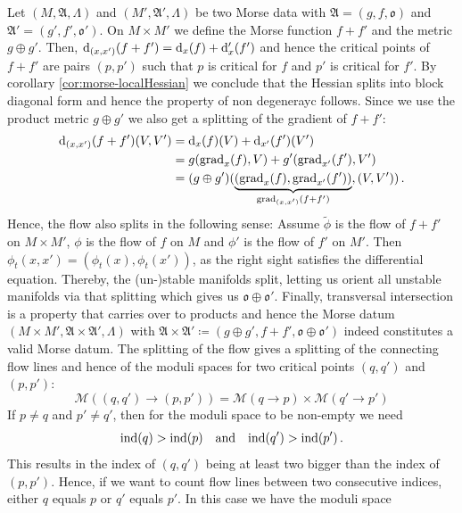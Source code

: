 \begin{definition}\label{def: Definition produce Morse datum}
	Let $(M,\mathfrak{A},\Lambda)$ and $(M',\mathfrak{A}',\Lambda)$ be two Morse data with $\mathfrak{A}=(g,f,\mathfrak{o})$ and $ \mathfrak{A}'=(g',f',\mathfrak{o}')$. On $M\times M'$ we define the Morse function $f+f'$ and the metric $g\oplus g'$. Then, $\mathop{}\!\mathrm{d}_{(x,x')}(f+f')=\mathop{}\!\mathrm{d}_x(f)+\mathop{}\!\mathrm{d}_x'(f')$ and hence the critical points of $f+f'$ are pairs $(p,p')$ such that $p$ is critical for $f$ and $p'$ is critical for $f'$. By corollary \ref{cor:morse-localHessian} we conclude that the Hessian splits into block diagonal form and hence the property of non degenerayc follows. Since we use the product metric $g\oplus g'$ we also get a splitting of the gradient of $f+f'$: 
	\begin{align*}
		\mathop{}\!\mathrm{d}_{(x,x')}(f+f')(V,V')
		&=\mathop{}\!\mathrm{d}_x(f)(V)+\mathop{}\!\mathrm{d}_{x'}(f')(V')\\
		&=g(\mathrm{grad}_x(f),V)+g'(\mathrm{grad}_{x'}(f'),V')\\
		&=(g\oplus g')(\underbrace{(\mathrm{grad}_x(f),\mathrm{grad}_{x'}(f'))}_{\mathrm{grad}_{(x,x')}(f+f')},(V,V'))\,.
	\end{align*} Hence, the flow also splits in the following sense: Assume $\tilde{\phi}$ is the flow of $f+f'$ on $M\times M'$, $\phi$ is the flow of $f$ on $M$ and $\phi'$ is the flow of $f'$ on $M'$. Then $\phi_t(x,x')=(\phi_t(x),\phi_t(x'))$, as the right sight satisfies the differential equation. Thereby, the (un-)stable manifolds split, letting us orient all unstable manifolds via that splitting which gives us $\mathfrak{o}\oplus \mathfrak{o}'$. Finally, transversal intersection is a property that carries over to products and hence the Morse datum $(M\times M',\mathfrak{A}\times \mathfrak{A}',\Lambda)$ with $\mathfrak{A}\times \mathfrak{A}'\coloneq (g\oplus g',f+f',\mathfrak{o}\oplus \mathfrak{o}')$ indeed constitutes a valid Morse datum.
	The splitting of the flow gives a splitting of the connecting flow lines and hence of the moduli spaces for two critical points $(q,q')$ and $(p,p')$: 
	\begin{equation*}
		\mathcal{M}\left((q,q')\to (p,p')\right)=\mathcal{M}(q\to p)\times \mathcal{M}(q'\to p') 
	\end{equation*} If $p\neq q$ and $p'\neq q'$, then for the moduli space to be non-empty we need 
	\begin{equation*}
		\mathrm{ind}(q)>\mathrm{ind}(p) \quad \text{and}\quad \mathrm{ind}(q')>\mathrm{ind}(p')\,.
	\end{equation*} This results in the index of $(q,q')$ being at least two bigger than the index of $(p,p')$. Hence, if we want to count flow lines between two consecutive indices, either $q$ equals $p$ or $q'$ equals $p'$. In this case we have the moduli space

\end{definition}
